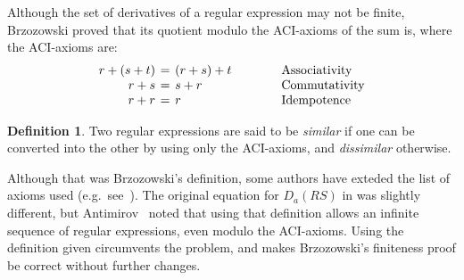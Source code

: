 \documentclass{article}
\theoremstyle{definition}
\newtheorem{defn}{Definition}
\begin{document}
Although the set of derivatives of a regular expression may not be finite,
Brzozowski proved that its quotient modulo the ACI-axioms of the sum is, where
the ACI-axioms are:
\[
  \arraycolsep=2pt
  \begin{array}{rcl@{\hspace{4em}}l}
    r + (s + t) &=& (r + s) + t & \text{Associativity}\\
    r + s &=& s + r &\text{Commutativity}\\
    r + r &=& r &\text{Idempotence}
\end{array}
\]
\begin{defn}
Two regular expressions are said to be \textit{similar} if one can be converted
into the other by using only the ACI-axioms, and \textit{dissimilar} otherwise.
\end{defn}
Although that was Brzozowski's definition, some authors have exteded the list of
axioms used (e.g.\ see~\cite{ORT09}). 
The original equation for $D_a(RS)$ in \cite{Brz64} was slightly different, but
Antimirov~\cite{An96} noted that using that definition allows an infinite
sequence of regular expressions, even modulo the ACI-axioms. Using the
definition given circumvents the problem, and makes Brzozowski's finiteness
proof be correct without further changes.
\end{document}
